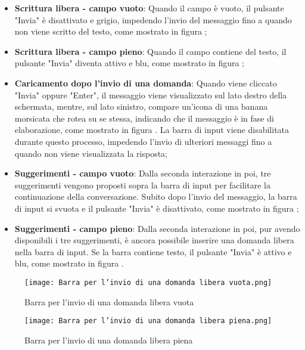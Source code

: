 \begin{itemize}  
    \item \textbf{Scrittura libera - campo vuoto}: Quando il campo è vuoto, il pulsante "Invia" è disattivato e grigio, impedendo l'invio del messaggio fino a quando non viene scritto del testo, come mostrato in figura ;
    \item \textbf{Scrittura libera - campo pieno}: Quando il campo contiene del testo, il pulsante "Invia" diventa attivo e blu, come mostrato in figura ;
    \item \textbf{Caricamento dopo l'invio di una domanda}: Quando viene cliccato "Invia" oppure "Enter", il messaggio viene visualizzato sul lato destro della schermata, mentre, sul lato sinistro, compare un'icona di una banana morsicata che rotea su se stessa, indicando che il messaggio è in fase di elaborazione, come mostrato in figura . La barra di input viene disabilitata durante questo processo, impedendo l'invio di ulteriori messaggi fino a quando non viene visualizzata la risposta;
    \item \textbf{Suggerimenti - campo vuoto}: Dalla seconda interazione in poi, tre suggerimenti vengono proposti sopra la barra di input per facilitare la continuazione della conversazione. Subito dopo l'invio del messaggio, la barra di input si svuota e il pulsante "Invia" è disattivato, come mostrato in figura ;
    \item \textbf{Suggerimenti - campo pieno}: Dalla seconda interazione in poi, pur avendo disponibili i tre suggerimenti, è ancora possibile inserire una domanda libera nella barra di input. Se la barra contiene testo, il pulsante "Invia" è attivo e blu, come mostrato in figura .
\end{itemize}

\begin{figure}[h]
    \centering
        \texttt{[image: Barra per l'invio di una domanda libera vuota.png]}
        \caption{Barra per l'invio di una domanda libera vuota}
        \label{fig:Barra per l'invio di una domanda libera vuota}        
\end{figure}
\begin{figure}[h]
    \centering
        \texttt{[image: Barra per l'invio di una domanda libera piena.png]}
        \caption{Barra per l'invio di una domanda libera piena}
        \label{fig:Barra per l'invio di una domanda libera piena}        
\end{figure}

